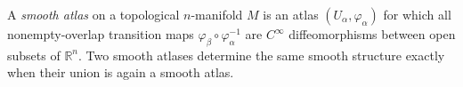 
A \emph{smooth atlas} on a topological $n$-manifold $M$ is an atlas $(U_\alpha,\varphi_\alpha)$ for which all nonempty-overlap transition maps $\varphi_\beta\circ\varphi_\alpha^{-1}$ are $C^\infty$ diffeomorphisms between open subsets of $\mathbb R^n$. Two smooth atlases determine the same smooth structure exactly when their union is again a smooth atlas.
